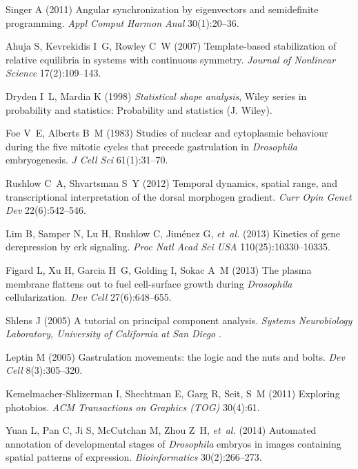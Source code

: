 \documentclass{pnastwo}
\begin{document}
\begin{article}
\begin{thebibliography}{10}
Singer A (2011) Angular synchronization by eigenvectors and semidefinite
  programming. \textit{Appl Comput Harmon Anal}
  30(1):20--36.

Ahuja S, Kevrekidis I~G, Rowley C~W (2007) Template-based stabilization of
  relative equilibria in systems with continuous symmetry. \textit{Journal of
  Nonlinear Science} 17(2):109--143.

Dryden I~L, Mardia K (1998) \textit{Statistical shape analysis}, Wiley series
  in probability and statistics: Probability and statistics (J. Wiley).

Foe V~E, Alberts B~M (1983) Studies of nuclear and cytoplasmic behaviour during
  the five mitotic cycles that precede gastrulation in \textit{{D}rosophila}
  embryogenesis. \textit{J Cell Sci} 61(1):31--70.

Rushlow C~A, Shvartsman S~Y (2012) Temporal dynamics, spatial range, and
  transcriptional interpretation of the dorsal morphogen gradient.
  \textit{Curr Opin Genet Dev} 22(6):542--546.

Lim B, Samper N, Lu H, Rushlow C, Jim{\'e}nez G, \textit{et~al.} (2013)
  Kinetics of gene derepression by erk signaling. \textit{Proc Natl Acad Sci USA} 110(25):10330--10335.

Figard L, Xu H, Garcia H~G, Golding I, Sokac A~M (2013) The plasma membrane
  flattens out to fuel cell-surface growth during \textit{{D}rosophila}
  cellularization. \textit{Dev Cell} 27(6):648--655.

Shlens J (2005) A tutorial on principal component analysis. \textit{Systems
  Neurobiology Laboratory, University of California at San Diego} .

Leptin M (2005) Gastrulation movements: the logic and the nuts and bolts.
  \textit{Dev Cell} 8(3):305--320.

Kemelmacher-Shlizerman I, Shechtman E, Garg R, Seit, S~M (2011)
Exploring photobios. \textit{ACM Transactions on Graphics (TOG)} 30(4):61.

Yuan L, Pan C, Ji S, McCutchan M, Zhou Z~H, \textit{et~al.} (2014) Automated
  annotation of developmental stages of \textit{{D}rosophila} embryos in images
  containing spatial patterns of expression. \textit{Bioinformatics}
  30(2):266--273.


\end{thebibliography}
\end{article}
\end{document}
